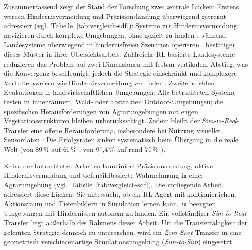 Zusammenfassend zeigt der Stand der Forschung zwei zentrale Lücken: Erstens werden Hindernisvermeidung und Präzisionslandung überwiegend getrennt adressiert (vgl.\ Tabelle~\ref{tab:vergleich-sdf}): Systeme zur Hindernisvermeidung navigieren durch komplexe Umgebungen, ohne gezielt zu landen \autocite{loquercioLearningHighspeedFlight2021, kimMonocularVisionbasedAutonomous2022, xuNavRLLearningSafe2024}, während Landesysteme überwiegend in hindernisfreien Szenarien operieren \autocite{polvaraSimtoRealQuadrotorLanding2020, ladoszAutonomousLandingMoving2024, peterTornadoDroneBioinspiredDRLbased2024}. \textcite{amendolaDroneLandingReinforcement2024} bestätigen dieses Muster in ihrer Übersichtsarbeit: Zahlreiche RL-basierte Landesysteme reduzieren das Problem auf zwei Dimensionen mit festem vertikalem Abstieg, was die Konvergenz beschleunigt, jedoch die Strategie einschränkt und komplexere Verhaltensweisen wie Hindernisvermeidung verhindert. Zweitens fehlen Evaluationen in landwirtschaftlichen Umgebungen: Alle betrachteten Systeme testen in Innenräumen, Wald- oder abstrakten Outdoor-Umgebungen; die spezifischen Herausforderungen von Agrarumgebungen mit engen Vegetationsstrukturen bleiben unberücksichtigt. Zudem bleibt der \textit{Sim-to-Real}-Transfer eine offene Herausforderung, insbesondere bei Nutzung visueller Sensordaten \autocite{amendolaDroneLandingReinforcement2024}: Die Erfolgsraten sinken systematisch beim Übergang in die reale Welt (von 89\,\% auf 61\,\% \autocite{polvaraSimtoRealQuadrotorLanding2020}, von 97,4\,\% auf rund 70\,\% \autocite{ladoszAutonomousLandingMoving2024}).

Keine der betrachteten Arbeiten kombiniert Präzisionslandung, aktive Hindernisvermeidung und tiefenbildbasierte Wahrnehmung in einer Agrarumgebung (vgl.\ Tabelle~\ref{tab:vergleich-sdf}).
Die vorliegende Arbeit adressiert diese Lücken: Sie untersucht, ob ein RL-Agent mit kontinuierlichem Aktionsraum und Tiefenbildern in Simulation lernen kann, in beengten Umgebungen mit Hindernissen autonom zu landen. Ein vollständiger \textit{Sim-to-Real}-Transfer liegt außerhalb des Rahmens dieser Arbeit. Um die Transferfähigkeit der gelernten Strategie dennoch zu untersuchen, wird ein \textit{Zero-Shot}-Transfer in eine geometrisch verschiedenartige Simulationsumgebung (\textit{Sim-to-Sim}) eingesetzt.
